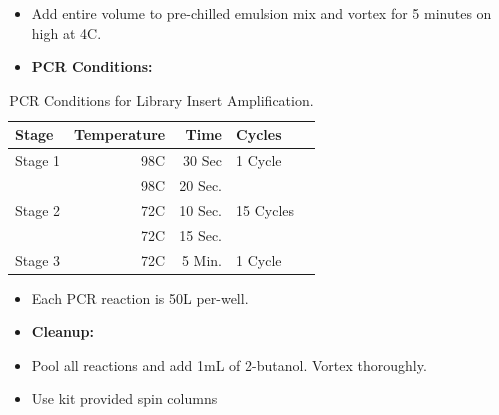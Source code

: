 \documentclass[a4paper]{article}
\begin{document}
        \begin{itemize}
			
            \item Add entire volume to pre-chilled emulsion mix and vortex for 5 minutes on high at 4C.
        	
            \item \textbf{PCR Conditions:}
            
         \end{itemize}
         \FloatBarrier
         \begin{table}[H]
			\centering
			\begin{tabular}{l|r|r|l|r}
				Stage 	& 	Temperature	&	Time	&	Cycles		\\\hline
				Stage 1	&	98C			&	30 Sec	&	1 Cycle		\\\hline
						&	98C			&	20 Sec.	&				\\
                Stage 2	&	72C			&	10 Sec.	&	15 Cycles	\\
                  		&	72C			&	15 Sec.	&				\\\hline
                Stage 3	&	72C			&	5 Min.	&	1 Cycle		\\
				\end{tabular}
           		\caption{\label{LibPCR}PCR Conditions for Library Insert Amplification.}
          \end{table}
            
        \begin{itemize}
        
			\item Each PCR reaction is 50\textmu L per-well.
        	
            \item \textbf{Cleanup:}
            
            \item Pool all reactions and add 1mL of 2-butanol. Vortex thoroughly.
            
            \item Use kit provided spin columns

        \end{itemize}
        
\end{document}
